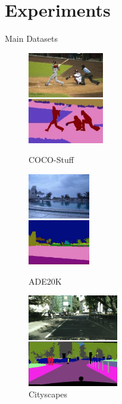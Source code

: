 \documentclass{beamer}
\begin{document}
\section{Experiments}
\begin{frame}{Main Datasets}
    \begin{figure}
        \begin{minipage}[b]{0.26\linewidth}
            \centering
            \includegraphics[height=4cm]{figures/coco_stuff.png}
            \caption{COCO-Stuff}
        \end{minipage}
        \hspace{0.5cm}
        \begin{minipage}[b]{0.25\linewidth}
            \centering
            \includegraphics[height=4cm]{figures/ade-20k.png}
            \caption{ADE20K}
        \end{minipage}
        \hspace{0.25cm}
        \begin{minipage}[b]{0.33\linewidth}
            \centering
            \includegraphics[height=4cm]{figures/cityscapes.png}
            \caption{Cityscapes}
        \end{minipage}
    \end{figure}
    

\end{frame}
\end{document}
